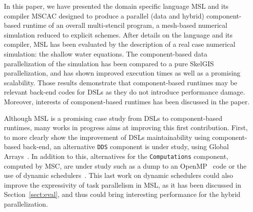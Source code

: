 In this paper, we have presented the domain specific language MSL and its compiler MSCAC designed to produce a parallel (data and hybrid) component-based runtime of an overall multi-stencil program, \ie a mesh-based numerical simulation reduced to explicit schemes. After details on the language and its compiler, MSL has been evaluated by the description of a real case numerical simulation: the shallow water equations. The component-based data parallelization of the simulation has been compared to a pure SkelGIS parallelization, and has shown improved execution times as well as a promising scalability. Those results demonstrate that component-based runtimes may be relevant back-end codes for DSLs as they do not introduce performance damage. Moreover, interests of component-based runtimes has been discussed in the paper.

Although MSL is a promising case study from DSLs to component-based runtimes, many works in progress aims at improving this first contribution. First, to more clearly show the improvement of DSLs maintainability using component-based back-end, an alternative \texttt{DDS} component is under study, using Global Arrays~\cite{Nieplocha:2006:AAP:1125980.1125985}. In addition to this, alternatives for the \texttt{Computations} component, computed by MSC, are under study such as a dump to an OpenMP~\cite{660313} code or the use of dynamic schedulers~\cite{Augonnet2011,Gautier:2013:XRS:2510661.2511383}. This last work on dynamic schedulers could also improve the expressivity of task parallelism in MSL, as it has been discussed in Section~\ref{sect:eval}, and thus could bring interesting performance for the hybrid parallelization.